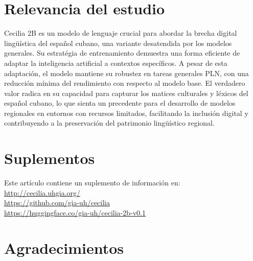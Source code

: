 \documentclass[10pt,twoside]{rcmart} %
\begin{document}
\section*{Relevancia del estudio} %

Cecilia 2B es un modelo de lenguaje crucial para abordar la brecha digital lingüística del español cubano, una variante desatendida por los modelos generales. Su estratégia de entrenamiento demuestra una forma eficiente de adaptar la inteligencia artificial a contextos específicos. A pesar de esta adaptación, el modelo mantiene su robustez en tareas generales PLN, con una reducción mínima del rendimiento con respecto al modelo base. El verdadero valor radica en su capacidad para capturar los matices culturales y léxicos del español cubano, lo que sienta un precedente para el desarrollo de modelos regionales en entornos con recursos limitados, facilitando la inclusión digital y contribuyendo a la preservación del patrimonio lingüístico regional.

\section*{Suplementos} %

	Este artículo contiene un suplemento de información en:\\
	\href{http://cecilia.uhgia.org/}{http://cecilia.uhgia.org/}\\
	\href{https://github.com/gia-uh/cecilia}{https://github.com/gia-uh/cecilia}\\
	\href{https://huggingface.co/gia-uh/cecilia-2b-v0.1}{https://huggingface.co/gia-uh/cecilia-2b-v0.1}

\section*{Agradecimientos} %
\end{document}
